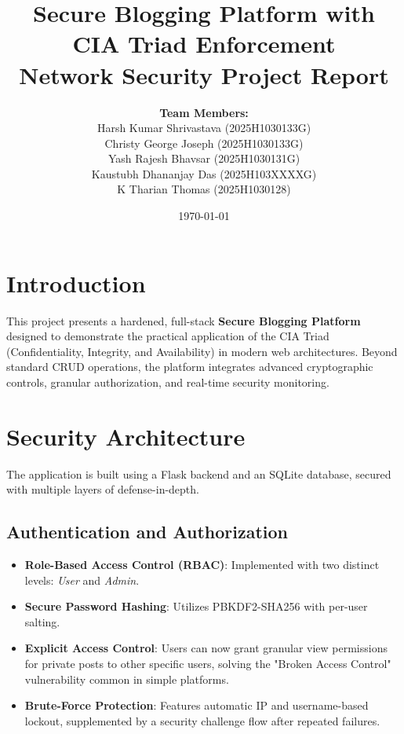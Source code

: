 \documentclass[12pt,a4paper]{article}
\title{
    \textbf{Secure Blogging Platform with CIA Triad Enforcement}\\
    \large Network Security Project Report
}
\author{
    \textbf{Team Members:}\\
    Harsh Kumar Shrivastava (2025H1030133G)\\
    Christy George Joseph (2025H1030133G)\\
    Yash Rajesh Bhavsar (2025H1030131G)\\
    Kaustubh Dhananjay Das (2025H103XXXXG)\\
    K Tharian Thomas (2025H1030128)
}
\date{\today}
\begin{document}
\maketitle
\newpage

\tableofcontents
\newpage

\section{Introduction}
This project presents a hardened, full-stack \textbf{Secure Blogging Platform} designed to demonstrate the practical application of the CIA Triad (Confidentiality, Integrity, and Availability) in modern web architectures. Beyond standard CRUD operations, the platform integrates advanced cryptographic controls, granular authorization, and real-time security monitoring.

\section{Security Architecture}
The application is built using a Flask backend and an SQLite database, secured with multiple layers of defense-in-depth.

\subsection{Authentication and Authorization}
\begin{itemize}[noitemsep]
    \item \textbf{Role-Based Access Control (RBAC)}: Implemented with two distinct levels: \textit{User} and \textit{Admin}.
    \item \textbf{Secure Password Hashing}: Utilizes PBKDF2-SHA256 with per-user salting.
    \item \textbf{Explicit Access Control}: Users can now grant granular view permissions for private posts to other specific users, solving the "Broken Access Control" vulnerability common in simple platforms.
    \item \textbf{Brute-Force Protection}: Features automatic IP and username-based lockout, supplemented by a security challenge flow after repeated failures.
\end{itemize}
\end{document}
